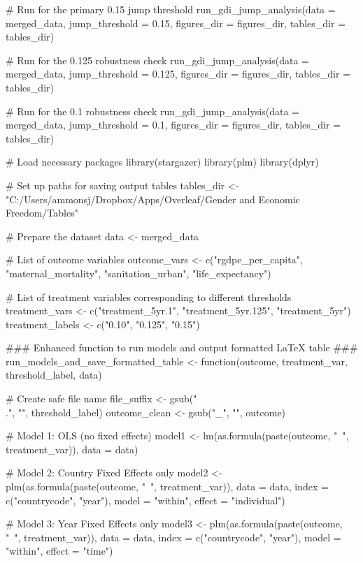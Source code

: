 {{# Run for the primary 0.15 jump threshold
run_gdi_jump_analysis(data = merged_data,
                      jump_threshold = 0.15,
                      figures_dir = figures_dir,
                      tables_dir = tables_dir)

# Run for the 0.125 robustness check
run_gdi_jump_analysis(data = merged_data,
                      jump_threshold = 0.125,
                      figures_dir = figures_dir,
                      tables_dir = tables_dir)

# Run for the 0.1 robustness check
run_gdi_jump_analysis(data = merged_data,
                      jump_threshold = 0.1,
                      figures_dir = figures_dir,
                      tables_dir = tables_dir)




# Load necessary packages
library(stargazer)
library(plm)
library(dplyr)

# Set up paths for saving output tables
tables_dir <- "C:/Users/ammonsj/Dropbox/Apps/Overleaf/Gender and Economic Freedom/Tables"

# Prepare the dataset
data <- merged_data

# List of outcome variables
outcome_vars <- c("rgdpe_per_capita", "maternal_mortality", "sanitation_urban", "life_expectancy")

# List of treatment variables corresponding to different thresholds
treatment_vars <- c("treatment_5yr.1", "treatment_5yr.125", "treatment_5yr")
treatment_labels <- c("0.10", "0.125", "0.15")

### Enhanced function to run models and output formatted LaTeX table ###
run_models_and_save_formatted_table <- function(outcome, treatment_var, threshold_label, data) {
  
  # Create safe file name
  file_suffix <- gsub("\\.", "", threshold_label)
  outcome_clean <- gsub("_", "", outcome)
  
  # Model 1: OLS (no fixed effects)
  model1 <- lm(as.formula(paste(outcome, "~", treatment_var)), data = data)
  
  # Model 2: Country Fixed Effects only
  model2 <- plm(as.formula(paste(outcome, "~", treatment_var)), 
                data = data, 
                index = c("countrycode", "year"), 
                model = "within", 
                effect = "individual")
  
  # Model 3: Year Fixed Effects only
  model3 <- plm(as.formula(paste(outcome, "~", treatment_var)), 
                data = data, 
                index = c("countrycode", "year"), 
                model = "within", 
                effect = "time")
  
}}}
